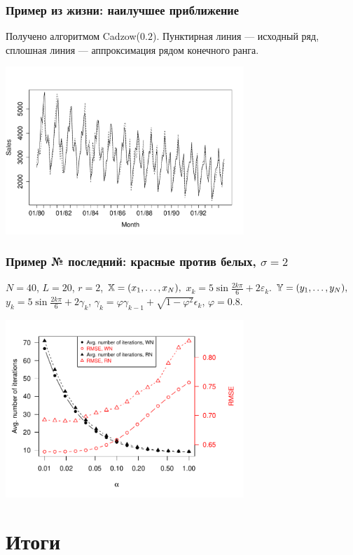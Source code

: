 \documentclass[unicode, notheorems]{beamer}
\begin{document}
\begin{frame}
	\frametitle{Пример из жизни: наилучшее приближение}
	Получено алгоритмом Cadzow($0.2$). Пунктирная линия --- исходный ряд, сплошная линия --- аппроксимация рядом конечного ранга.
	\vspace{-0.2cm}
	\begin{center}
		\includegraphics*[width = 9cm]{rlimage.pdf}
	\end{center}
\end{frame}

\begin{frame}
	\frametitle{Пример № последний: красные против белых, $\sigma = 2$}
	$N = 40$, $L = 20$, $r = 2$, $\mathbb{X} = (x_{1}, \ldots, x_N),$  $x_k = 5\sin{\frac{2 k \pi}{6}} + 2 \varepsilon_k$.
	$\mathbb{Y} = (y_{1}, \ldots, y_N),$  $y_k = 5\sin{\frac{2 k \pi}{6}} + 2 \gamma_k$, $\gamma_k = \varphi \gamma_{k - 1} + \sqrt{1 - \varphi^2} \epsilon_k$, $\varphi = 0.8$.
	\vspace{-0.4cm}
	\begin{center}
		\includegraphics*[width = 9cm]{2axis-2.pdf}
	\end{center}
\end{frame}

\section{Итоги}
\end{document}
